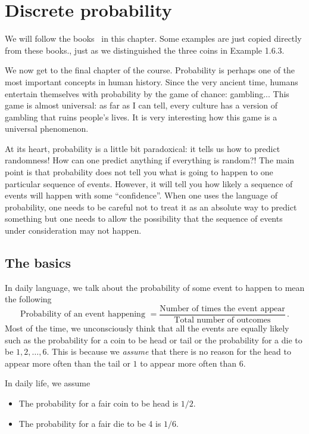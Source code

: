 \chapter{Discrete probability}
We will follow the books~\cite{Newstead,DeGroot2012} in this chapter.
Some examples are just copied directly from these books., just as we distinguished the three coins in Example 1.6.3.

We now get to the final chapter of the course.
Probability is perhaps one of the most important concepts in human history.
Since the very ancient time, humans entertain themselves with probability by the
game of chance: gambling... 
This game is almost universal: as far as I can tell, every culture has a version
of gambling that ruins people's lives.
It is very interesting how this game is a universal phenomenon.

At its heart, probability is a little bit paradoxical: it tells us how to predict
randomness! How can one predict anything if everything is random?!
The main point is that probability does not tell you what is going to happen
to one particular sequence of events.
However, it will tell you how likely a sequence of events will happen
with some ``confidence''.
When one uses the language of probability, one needs to be careful not to treat
it as an absolute way to predict something but one needs to allow the possibility 
that the sequence of events under consideration may not happen.


\section{The basics}

In daily language, we talk about the probability of some event to happen 
to mean the following
\begin{equation*}
    \text{Probability of an event happening  }
    = \frac{\text{Number of times the event appear}}{\text{Total number of  outcomes}} \,.
\end{equation*}
Most of the time, we unconsciously think that all the events are equally likely such as the probability for a coin to be head or tail or the probability for a die to be $1,2,\dots, 6$.
This is because we \emph{assume} that there is no reason for the head to appear more often than the tail or $1$ to appear more often than $6$.

\begin{example}
    In daily life, we assume
   \begin{itemize}
       \item The probability for a fair coin to be head is $1/2$.
       \item The probability for a fair die to be 4 is $1/6$.
   \end{itemize} 
\end{example}

